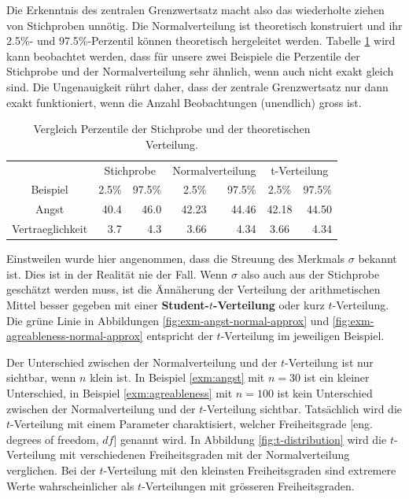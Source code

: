 \documentclass[
]{book}
\theoremstyle{definition}
\theoremstyle{definition}
\theoremstyle{definition}
\theoremstyle{definition}
\theoremstyle{remark}
\begin{document}
Die Erkenntnis des zentralen Grenzwertsatz macht also das wiederholte ziehen von Stichproben unnötig. Die Normalverteilung ist theoretisch konstruiert und ihr 2.5\%- und 97.5\%-Perzentil können theoretisch hergeleitet werden. Tabelle \ref{tab:quantiles-norm} wird kann beobachtet werden, dass für unsere zwei Beispiele die Perzentile der Stichprobe und der Normalverteilung sehr ähnlich, wenn auch nicht exakt gleich sind. Die Ungenauigkeit rührt daher, dass der zentrale Grenzwertsatz nur dann exakt funktioniert, wenn die Anzahl Beobachtungen (unendlich) gross ist.

\begin{table}
\centering
\caption{\label{tab:quantiles-norm}Vergleich Perzentile der Stichprobe und der theoretischen Verteilung.}
\centering
\begin{tabular}[t]{crrrrcr}
\toprule
\multicolumn{1}{c}{ } & \multicolumn{2}{c}{Stichprobe} & \multicolumn{2}{c}{Normalverteilung} & \multicolumn{2}{c}{t-Verteilung} \\
\cmidrule(l{3pt}r{3pt}){2-3} \cmidrule(l{3pt}r{3pt}){4-5} \cmidrule(l{3pt}r{3pt}){6-7}
Beispiel & 2.5\% & 97.5\% & 2.5\% & 97.5\% & 2.5\% & 97.5\%\\
\midrule
Angst & 40.4 & 46.0 & 42.23 & 44.46 & 42.18 & 44.50\\
Vertraeglichkeit & 3.7 & 4.3 & 3.66 & 4.34 & 3.66 & 4.34\\
\bottomrule
\end{tabular}
\end{table}

Einstweilen wurde hier angenommen, dass die Streuung des Merkmals \(\sigma\) bekannt ist. Dies ist in der Realität nie der Fall. \label{customdef-student-verteilung}{Wenn \(\sigma\) also auch aus der Stichprobe geschätzt werden muss, ist die Ännäherung der Verteilung der arithmetischen Mittel besser gegeben mit einer \textbf{Student-\(t\)-Verteilung} oder kurz \(t\)-Verteilung.} Die grüne Linie in Abbildungen \ref{fig:exm-angst-normal-approx} und \ref{fig:exm-agreableness-normal-approx} entspricht der \(t\)-Verteilung im jeweiligen Beispiel.

Der Unterschied zwischen der Normalverteilung und der \(t\)-Verteilung ist nur sichtbar, wenn \(n\) klein ist. In Beispiel \ref{exm:angst} mit \(n = 30\) ist ein kleiner Unterschied, in Beispiel \ref{exm:agreableness} mit \(n = 100\) ist kein Unterschied zwischen der Normalverteilung und der \(t\)-Verteilung sichtbar. Tatsächlich wird die \(t\)-Verteilung mit einem Parameter charaktisiert, welcher Freiheitsgrade {[}eng. degrees of freedom, \(df\){]} genannt wird. In Abbildung \ref{fig:t-distribution} wird die \(t\)-Verteilung mit verschiedenen Freiheitsgraden mit der Normalverteilung verglichen. Bei der \(t\)-Verteilung mit den kleinsten Freiheitsgraden sind extremere Werte wahrscheinlicher als \(t\)-Verteilungen mit grösseren Freiheitsgraden.
\end{document}
